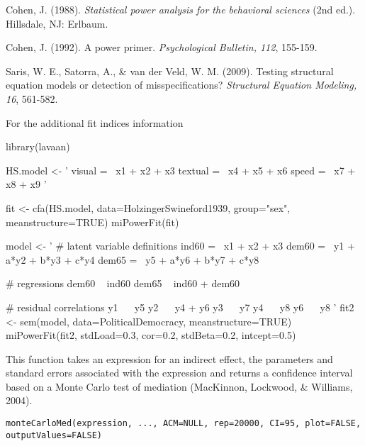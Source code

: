 \documentclass[a4paper]{book}
\begin{document}
%
\begin{References}\relax
Cohen, J. (1988). \emph{Statistical power analysis for the behavioral sciences} (2nd ed.). Hillsdale, NJ: Erlbaum.

Cohen, J. (1992). A power primer. \emph{Psychological Bulletin, 112}, 155-159.

Saris, W. E., Satorra, A., \& van der Veld, W. M. (2009). Testing structural equation models or detection of misspecifications? \emph{Structural Equation Modeling, 16}, 561-582.
\end{References}
%
\begin{SeeAlso}\relax
{} For the additional fit indices information
\end{SeeAlso}
%
\begin{Examples}
\begin{ExampleCode}
library(lavaan)

HS.model <- ' visual  =~ x1 + x2 + x3
              textual =~ x4 + x5 + x6
              speed   =~ x7 + x8 + x9 '

fit <- cfa(HS.model, data=HolzingerSwineford1939, group="sex", meanstructure=TRUE)
miPowerFit(fit)

model <- ' 
  # latent variable definitions
     ind60 =~ x1 + x2 + x3
     dem60 =~ y1 + a*y2 + b*y3 + c*y4
     dem65 =~ y5 + a*y6 + b*y7 + c*y8

  # regressions
    dem60 ~ ind60
    dem65 ~ ind60 + dem60

  # residual correlations
    y1 ~~ y5
    y2 ~~ y4 + y6
    y3 ~~ y7
    y4 ~~ y8
    y6 ~~ y8
'
fit2 <- sem(model, data=PoliticalDemocracy, meanstructure=TRUE)
miPowerFit(fit2, stdLoad=0.3, cor=0.2, stdBeta=0.2, intcept=0.5)
\end{ExampleCode}
\end{Examples}
%
\begin{Description}\relax
This function takes an expression for an indirect effect, the parameters and standard errors associated with the expression and returns a confidence interval based on a Monte Carlo test of mediation (MacKinnon, Lockwood, \& Williams, 2004).
\end{Description}
%
\begin{Usage}
\begin{verbatim}
monteCarloMed(expression, ..., ACM=NULL, rep=20000, CI=95, plot=FALSE, outputValues=FALSE)
\end{verbatim}
\end{Usage}
\end{document}
